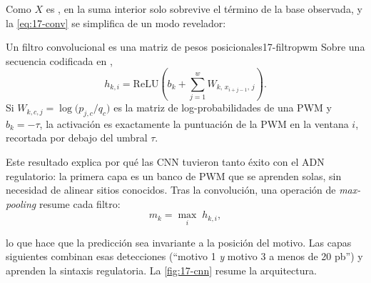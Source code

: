 \begin{simbolos}
\end{simbolos}

Como $X$ es , en la suma interior solo sobrevive el término de la base observada, y la \cref{eq:17-conv} se simplifica de un modo revelador:

\begin{teorema}{Un filtro convolucional es una matriz de pesos posicionales}{17-filtropwm}
Sobre una secuencia codificada en ,
\begin{equation}\label{eq:17-filtropwm}
h_{k,i} = \mathrm{ReLU}\!\left(b_k + \sum_{j=1}^{w} W_{k,\,x_{i+j-1},\,j}\right).
\end{equation}
Si $W_{k,c,j}=\log\big(p_{j,c}/q_c\big)$ es la matriz de log-probabilidades de una PWM y $b_k=-\tau$, la activación es exactamente la puntuación de la PWM en la ventana $i$, recortada por debajo del umbral $\tau$.
\end{teorema}

\begin{simbolos}
\end{simbolos}

Este resultado explica por qué las CNN tuvieron tanto éxito con el ADN regulatorio: la primera capa es un banco de PWM que se aprenden solas, sin necesidad de alinear sitios conocidos. Tras la convolución, una operación de \emph{max-pooling} resume cada filtro:
\begin{equation}\label{eq:17-maxpool}
m_k = \max_{i}\; h_{k,i},
\end{equation}

\begin{simbolos}
\end{simbolos}

\noindent lo que hace que la predicción sea invariante a la posición del motivo. Las capas siguientes combinan esas detecciones (``motivo 1 \emph{y} motivo 3 a menos de 20 pb'') y aprenden la sintaxis regulatoria. La \cref{fig:17-cnn} resume la arquitectura.

